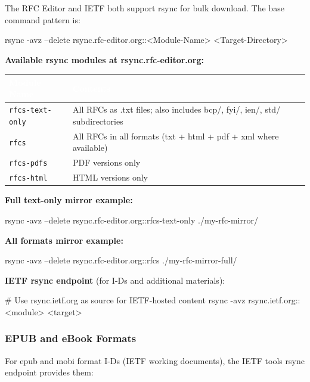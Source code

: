 \documentclass[11pt,letterpaper]{article}
\newcommand{\tableheader}[1]{\textbf{\sffamily\textcolor{white}{#1}}}
\begin{document}
The RFC Editor and IETF both support rsync for bulk download. The base command pattern is:

\begin{codebox}
rsync -avz --delete rsync.rfc-editor.org::<Module-Name> <Target-Directory>
\end{codebox}

\textbf{Available rsync modules at rsync.rfc-editor.org:}

\begin{center}
\begin{tabularx}{\textwidth}{L{4.5cm}X}
\toprule
{}
\tableheader{Module Name} & \tableheader{Contents} \\
\midrule
\texttt{rfcs-text-only} & All RFCs as .txt files; also includes bcp/, fyi/, ien/, std/ subdirectories \\
\texttt{rfcs} & All RFCs in all formats (txt + html + pdf + xml where available) \\
\texttt{rfcs-pdfs} & PDF versions only \\
\texttt{rfcs-html} & HTML versions only \\
\bottomrule
\end{tabularx}
\end{center}

\textbf{Full text-only mirror example:}

\begin{codebox}
rsync -avz --delete rsync.rfc-editor.org::rfcs-text-only ./my-rfc-mirror/
\end{codebox}

\textbf{All formats mirror example:}

\begin{codebox}
rsync -avz --delete rsync.rfc-editor.org::rfcs ./my-rfc-mirror-full/
\end{codebox}

\textbf{IETF rsync endpoint} (for I-Ds and additional materials):

\begin{codebox}
# Use rsync.ietf.org as source for IETF-hosted content
rsync -avz rsync.ietf.org::<module> <target>
\end{codebox}

\subsubsection{EPUB and eBook Formats}

For epub and mobi format I-Ds (IETF working documents), the IETF tools rsync endpoint provides them:
\end{document}
